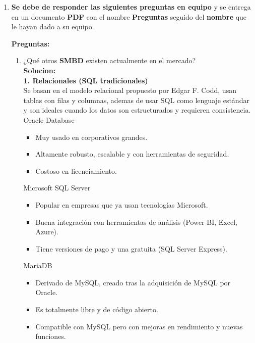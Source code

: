 \documentclass[12pt]{report}
\begin{document}
\begin{enumerate}[label=\roman*.]

\item \textbf{Se debe de responder las siguientes preguntas en equipo} y se entrega en un documento \textbf{PDF} con el nombre \textbf{Preguntas} seguido del \textbf{nombre} que le hayan dado a su equipo.

\medskip

\textbf{Preguntas:}

\begin{enumerate}[label=\textbf{\arabic*.}, itemsep=2.0em]
  \item ¿Qué otros \textbf{SMBD} existen actualmente en el mercado?\\
    \textbf{Solucion:}\\
    \textbf{1. Relacionales (SQL tradicionales)}\\
Se basan en el modelo relacional propuesto por Edgar F. Codd, usan tablas con filas y columnas, ademas de usar SQL como lenguaje estándar y son ideales cuando los datos son estructurados y requieren consistencia.\\

Oracle Database
\begin{itemize}
    \item Muy usado en corporativos grandes.
    \item Altamente robusto, escalable y con herramientas de seguridad.
    \item Costoso en licenciamiento.
\end{itemize}

Microsoft SQL Server
\begin{itemize}
    \item Popular en empresas que ya usan tecnologías Microsoft.
    \item Buena integración con herramientas de análisis (Power BI, Excel, Azure).
    \item Tiene versiones de pago y una gratuita (SQL Server Express).
\end{itemize}

MariaDB
\begin{itemize}
    \item Derivado de MySQL, creado tras la adquisición de MySQL por Oracle.
    \item Es totalmente libre y de código abierto.
    \item Compatible con MySQL pero con mejoras en rendimiento y nuevas funciones.
\end{itemize}


\end{enumerate}
\end{enumerate}
\end{document}
